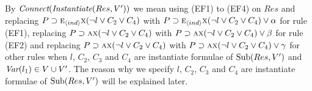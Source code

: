 \documentclass{article}
\begin{document}
By $\emph{Connect}(\emph{Instantiate}(Res, V'))$ we mean using (EF1) to (EF4) on $Res$ and replacing $P\supset \textsc{e}_{{\langle{ind}\rangle}}\textsc{x} (\neg l \vee C_2 \vee C_4)$ with $P\supset \textsc{e}_{{\langle{ind}\rangle}}\textsc{x} (\neg l \vee C_2 \vee C_4) \vee \alpha$ for rule (EF1), replacing $P\supset \textsc{a}\textsc{x} (\neg l \vee C_2 \vee C_4)$ with $P\supset \textsc{a}\textsc{x} (\neg l \vee C_2 \vee C_4) \vee \beta$ for rule (EF2) and replacing $P\supset \textsc{a}\textsc{x} (\neg l \vee C_2 \vee C_4)$ with $P\supset \textsc{a}\textsc{x} (\neg l \vee C_2 \vee C_4) \vee \gamma$ for other rules when $l$, $C_2$, $C_3$  and $C_4$ are instantiate formulae of  $\textrm{Sub}(Res, V')$ and $\textit{Var}(l_1) \in V\cup V'$.
The reason why we specify $l$, $C_2$, $C_3$  and $C_4$ are instantiate formulae of  $\textrm{Sub}(Res, V')$  will be explained later.


%
%
%
%
\end{document}
